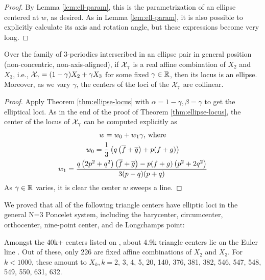 \begin{proof}
By Lemma \ref{lem:ell-param}, this is the parametrization of an ellipse centered at $w$, as desired. As in Lemma \ref{lem:ell-param}, it is also possible to explicitly calculate its axis and rotation angle, but these expressions become very long.

\end{proof}

\begin{corollary}
Over the family of 3-periodics interscribed in an ellipse pair in general position (non-concentric, non-axis-aligned),
if $\mathcal{X}_\gamma$ is a real affine combination of $X_2$ and $X_3$, i.e., $\mathcal{X}_\gamma=(1-\gamma) X_2+\gamma X_3$ for some fixed $\gamma\in\mathbb{R}$, then its locus is an ellipse. Moreover, as we vary $\gamma$, the centers of the loci of the $\mathcal{X}_\gamma$ are collinear.
\end{corollary}

\begin{proof}
Apply Theorem \ref{thm:ellipse-locus} with $\alpha=1-\gamma, \beta=\gamma$ to get the elliptical loci. As in the end of the proof of Theorem \ref{thm:ellipse-locus}, the center of the locus of $\mathcal{X}_\gamma$ can be computed explicitly as 
\begin{gather*}
    w=w_0+w_1 \gamma \text{, where}\\
    w_0=\frac{1}{3} \left(q \left(\overline{f}+\overline{g}\right)+p (f+g)\right)\\
    w_1=\frac{q \left(2 p^2+q^2\right) \left(\overline{f}+\overline{g}\right)-p (f+g) \left(p^2+2 q^2\right)}{3 (p-q) (p+q)}
\end{gather*}
As $\gamma\in\mathbb{R}$ varies, it is clear the center $w$ sweeps a line.
\end{proof}

We proved that all of the following triangle centers have elliptic loci in the general N=3 Poncelet system, including the barycenter, circumcenter, orthocenter, nine-point center, and de Longchamps point:

\begin{observation}
Amongst the 40k+ centers listed on \cite{etc}, about 4.9k triangle centers lie on the Euler line \cite{etc-central-lines}. Out of these, only 226 are fixed affine combinations of $X_2$ and $X_3$. For $k<1000$, these amount to $X_k,k=${\small 2, 3, 4, 5, 20, 140, 376, 381, 382, 546, 547, 548, 549, 550, 631, 
632}.
\label{obs:affine-euler-line}
\end{observation}

